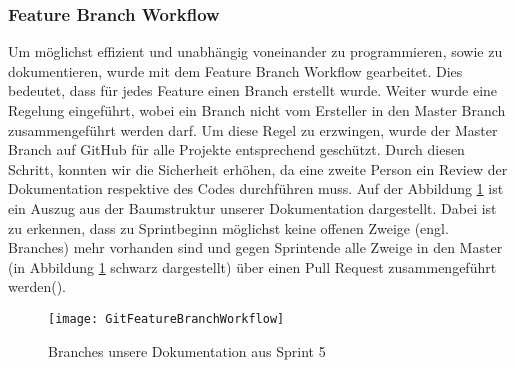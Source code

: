 \subsubsection{Feature Branch Workflow}
Um möglichst effizient und unabhängig voneinander zu programmieren, sowie zu dokumentieren, wurde mit dem Feature Branch Workflow gearbeitet. Dies bedeutet, dass für jedes Feature einen Branch erstellt wurde. Weiter wurde eine Regelung eingeführt, wobei ein Branch nicht vom Ersteller in den Master Branch zusammengeführt werden darf. Um diese Regel zu erzwingen, wurde der Master Branch auf GitHub für alle Projekte entsprechend geschützt. Durch diesen Schritt, konnten wir die Sicherheit erhöhen, da eine zweite Person ein Review der Dokumentation respektive des Codes durchführen muss.
Auf der Abbildung \ref{fig:FeatureBranchWorkflow} ist ein Auszug aus der Baumstruktur unserer Dokumentation dargestellt. Dabei ist zu erkennen, dass zu Sprintbeginn möglichst keine offenen Zweige (engl. Branches) mehr vorhanden sind und gegen Sprintende alle Zweige in den Master (in Abbildung \ref{fig:FeatureBranchWorkflow} schwarz dargestellt) über einen Pull Request zusammengeführt werden(\cite{BaumannWicki2018}).

\begin{figure}[htb]
	\center
	\texttt{[image: GitFeatureBranchWorkflow]}
	\caption{Branches unsere Dokumentation aus Sprint 5}
	\label{fig:FeatureBranchWorkflow}
\end{figure}
